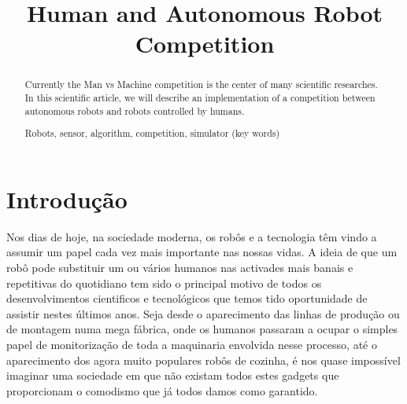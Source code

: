 \documentclass[conference]{IEEEtran}
\begin{document}
%
\title{Human and Autonomous Robot Competition}


\author{
}





\maketitle


\begin{abstract}
Currently the Man vs Machine competition is the center of many scientific researches. In this scientific article, we will describe an implementation of a competition between autonomous robots and robots controlled by humans. 

Robots, sensor, algorithm, competition, simulator (key words)

\end{abstract}

\IEEEpeerreviewmaketitle



\section{Introdução}
Nos dias de hoje, na sociedade moderna, os robôs e a tecnologia têm vindo a assumir um papel cada vez mais importante nas nossas vidas. A ideia de que um robô pode substituir um ou vários humanos nas activades mais banais e repetitivas do quotidiano tem sido o principal motivo de todos os desenvolvimentos cientificos e tecnológicos que temos tido oportunidade de assistir nestes últimos anos. Seja desde o aparecimento das linhas de produção ou de montagem numa mega fábrica, onde os humanos passaram a ocupar o simples papel de monitorização de toda a maquinaria envolvida nesse processo, até o aparecimento dos agora muito populares robôs de cozinha, é nos quase impossível imaginar uma sociedade em que não existam todos estes gadgets que proporcionam o comodismo que já todos damos como garantido.
\end{document}
